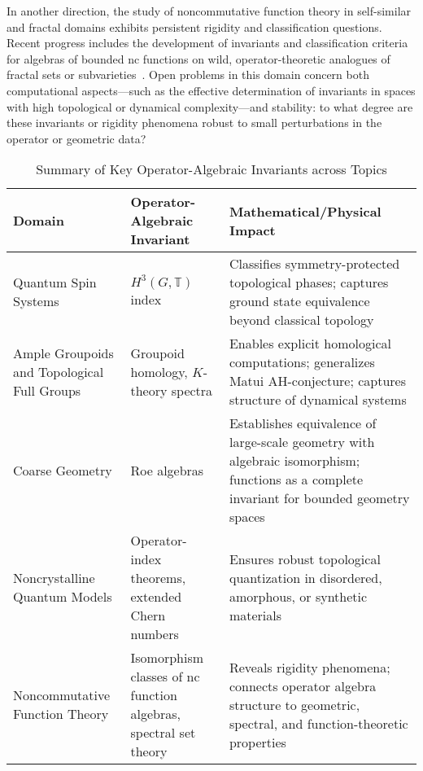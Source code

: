 \documentclass[sigconf]{acmart}
\begin{document}
In another direction, the study of noncommutative function theory in self-similar and fractal domains exhibits persistent rigidity and classification questions. Recent progress includes the development of invariants and classification criteria for algebras of bounded nc functions on wild, operator-theoretic analogues of fractal sets or subvarieties~\cite{ref98,ref14}. Open problems in this domain concern both computational aspects---such as the effective determination of invariants in spaces with high topological or dynamical complexity---and stability: to what degree are these invariants or rigidity phenomena robust to small perturbations in the operator or geometric data?

\begin{table*}[htbp]
\centering
\caption{Summary of Key Operator-Algebraic Invariants across Topics}
\label{tab:operator_invariants}
\begin{adjustbox}{max width=\textwidth}
\begin{tabular}{lll}
\toprule
\textbf{Domain} & \textbf{Operator-Algebraic Invariant} & \textbf{Mathematical/Physical Impact} \\
\midrule
Quantum Spin Systems     & $H^3(G, \mathbb{T})$ index & Classifies symmetry-protected topological phases; captures ground state equivalence beyond classical topology \\
Ample Groupoids and Topological Full Groups & Groupoid homology, $K$-theory spectra & Enables explicit homological computations; generalizes Matui AH-conjecture; captures structure of dynamical systems \\
Coarse Geometry         & Roe algebras              & Establishes equivalence of large-scale geometry with algebraic isomorphism; functions as a complete invariant for bounded geometry spaces \\
Noncrystalline Quantum Models & Operator-index theorems, extended Chern numbers & Ensures robust topological quantization in disordered, amorphous, or synthetic materials \\
Noncommutative Function Theory & Isomorphism classes of nc function algebras, spectral set theory & Reveals rigidity phenomena; connects operator algebra structure to geometric, spectral, and function-theoretic properties \\
\bottomrule
\end{tabular}
\end{adjustbox}
\end{table*}
\end{document}
